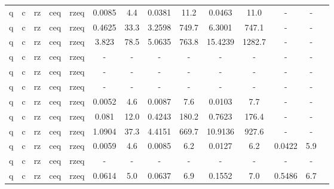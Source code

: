 \begin{table}[htb]
{\begin{tabular}{|c|c|c|c|c|c|c|c|c|c|c|c|c|c|}
q & c & rz & ceq & rzeq & 0.0085 & 4.4 & 0.0381 & 11.2 & 0.0463 & 11.0 & - & - \\ 
q & c & rz & ceq & rzeq & 0.4625 & 33.3 & 3.2598 & 749.7 & 6.3001 & 747.1 & - & - \\ 
q & c & rz & ceq & rzeq & 3.823 & 78.5 & 5.0635 & 763.8 & 15.4239 & 1282.7 & - & - \\ 
q & c & rz & ceq & rzeq & - & - & - & - & - & - & - & - \\ 
q & c & rz & ceq & rzeq & - & - & - & - & - & - & - & - \\ 
q & c & rz & ceq & rzeq & - & - & - & - & - & - & - & - \\ 
q & c & rz & ceq & rzeq & 0.0052 & 4.6 & 0.0087 & 7.6 & 0.0103 & 7.7 & - & - \\ 
q & c & rz & ceq & rzeq & 0.081 & 12.0 & 0.4243 & 180.2 & 0.7623 & 176.4 & - & - \\ 
q & c & rz & ceq & rzeq & 1.0904 & 37.3 & 4.4151 & 669.7 & 10.9136 & 927.6 & - & - \\ 
q & c & rz & ceq & rzeq & 0.0059 & 4.6 & 0.0085 & 6.2 & 0.0127 & 6.2 & 0.0422 & 5.9 \\ 
q & c & rz & ceq & rzeq & - & - & - & - & - & - & - & - \\ 
q & c & rz & ceq & rzeq & 0.0614 & 5.0 & 0.0637 & 6.9 & 0.1552 & 7.0 & 0.5486 & 6.7 \\ 
\hline 
\end{tabular}} 
\end{table} 
